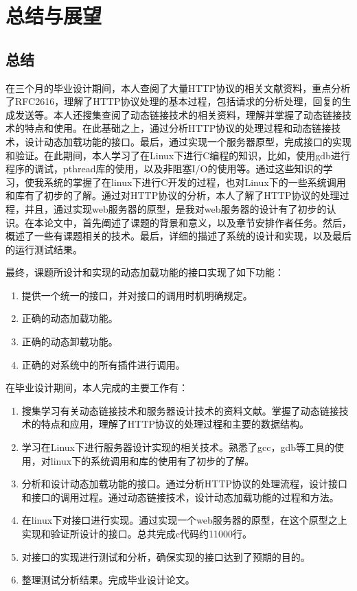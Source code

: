 \documentclass[12pt, twoside, a4paper, xetex]{report}
\begin{document}
	
	
\chapter{总结与展望}
\section{总结}
	在三个月的毕业设计期间，本人查阅了大量HTTP协议的相关文献资料，重点分析了RFC2616，理解了HTTP协议处理的基本过程，包括请求的分析处理，回复的生成发送等。本人还搜集查阅了动态链接技术的相关资料，理解并掌握了动态链接技术的特点和使用。在此基础之上，通过分析HTTP协议的处理过程和动态链接技术，设计动态加载功能的接口。最后，通过实现一个服务器原型，完成接口的实现和验证。在此期间，本人学习了在Linux下进行C编程的知识，比如，使用gdb进行程序的调试，pthread库的使用，以及非阻塞I/O的使用等。通过这些知识的学习，使我系统的掌握了在linux下进行C开发的过程，也对Linux下的一些系统调用和库有了初步的了解。通过对HTTP协议的分析，本人了解了HTTP协议的处理过程，并且，通过实现web服务器的原型，是我对web服务器的设计有了初步的认识。在本论文中，首先阐述了课题的背景和意义，以及章节安排作者任务。然后，概述了一些有课题相关的技术。最后，详细的描述了系统的设计和实现，以及最后的运行测试结果。
	
	最终，课题所设计和实现的动态加载功能的接口实现了如下功能：
	\begin{enumerate}
		\item 提供一个统一的接口，并对接口的调用时机明确规定。
		\item 正确的动态加载功能。
		\item 正确的动态卸载功能。
		\item 正确的对系统中的所有插件进行调用。
	\end{enumerate}
	
	在毕业设计期间，本人完成的主要工作有：
	\begin{enumerate}
		\item 搜集学习有关动态链接技术和服务器设计技术的资料文献。掌握了动态链接技术的特点和应用，理解了HTTP协议的处理过程和主要的数据结构。
		\item 学习在Linux下进行服务器设计实现的相关技术。熟悉了gcc，gdb等工具的使用，对linux下的系统调用和库的使用有了初步的了解。
		\item 分析和设计动态加载功能的接口。通过分析HTTP协议的处理流程，设计接口和接口的调用过程。通过动态链接技术，设计动态加载功能的过程和方法。
		\item 在linux下对接口进行实现。通过实现一个web服务器的原型，在这个原型之上实现和验证所设计的接口。总共完成c代码约11000行。
		\item 对接口的实现进行测试和分析，确保实现的接口达到了预期的目的。
		\item 整理测试分析结果。完成毕业设计论文。
	\end{enumerate}
	
\end{document}

